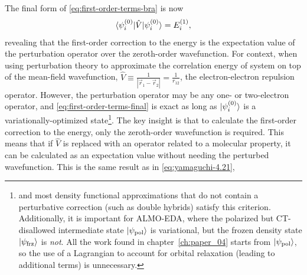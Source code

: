 \documentclass[%
class = book,%
crop = false,%
float = true,%
multi = true,%
preview = false,%
]{standalone}
\begin{document}
The final form of \eqref{eq:first-order-terms-bra} is now
\begin{equation}
  \label{eq:first-order-terms-final}
  \braket{\psi_{i}^{(0)} | \hat{V} | \psi_{i}^{(0)}} = E_{i}^{(1)},
\end{equation}
revealing that the first-order correction to the energy is the expectation value of the perturbation operator over the zeroth-order wavefunction. For context, when using perturbation theory to approximate the correlation energy of system on top of the mean-field wavefunction, \(\hat{V} \equiv \frac{1}{|\vec{r}_{1} - \vec{r}_{2}|} = \frac{1}{r_{12}}\), the electron-electron repulsion operator. However, the perturbation operator may be any one- or two-electron operator, and \eqref{eq:first-order-terms-final} is exact as long as \(\ket{\psi_{i}^{(0)}}\) is a variationally-optimized state\footnote{\hf{} and most density functional approximations that do not contain a perturbative correction (such as double hybrids) satisfy this criterion. Additionally, it is important for ALMO-EDA, where the polarized but CT-disallowed intermediate state \(\ket{\psi_{\text{pol}}}\) is variational, but the frozen density state \(\ket{\psi_{\text{frz}}}\) is \emph{not}. All the work found in chapter~\ref{ch:paper_04} starts from \(\ket{\psi_{\text{pol}}}\), so the use of a Lagrangian to account for orbital relaxation (leading to additional terms) is unnecessary.}. The key insight is that to calculate the first-order correction to the energy, only the zeroth-order wavefunction is required. This means that if \(\hat{V}\) is replaced with an operator related to a molecular property, it can be calculated as an expectation value without needing the perturbed wavefunction. This is the same result as in \eqref{eq:yamaguchi-4.21}, 
\end{document}
